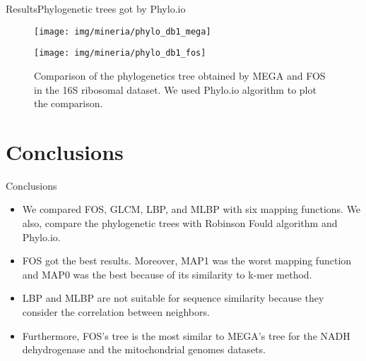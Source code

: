 \documentclass[10pt]{beamer}
\newcommand{\1}{
	\setbeamertemplate{background}{
		\texttt{[image: img/1\_dna]}
		\tikz[overlay] \fill[fill opacity=0.75,fill=white] (0,0) rectangle (-\paperwidth,\paperheight);
	}
}
\begin{document}
\begin{frame}{Results}{Phylogenetic trees got by Phylo.io}
	\begin{figure}[hbt!]
		\centering
		\begin{multicols}{2}
			\texttt{[image: img/mineria/phylo\_db1\_mega]}\par 
			\texttt{[image: img/mineria/phylo\_db1\_fos]}\par 
		\end{multicols}
		\caption{Comparison of the phylogenetics tree obtained by MEGA and FOS in the 16S ribosomal dataset. We used Phylo.io algorithm to plot the comparison.}
		\label{img:mouse}
	\end{figure}
\end{frame}

\section{Conclusions}
\begin{frame}{Conclusions}{}
	\begin{itemize}
		\item We compared FOS, GLCM, LBP, and MLBP with six mapping functions. We also, compare the phylogenetic trees with Robinson Fould algorithm and Phylo.io. \pause
		\item FOS got the best results. Moreover, MAP1 was the worst mapping function and MAP0 was the best because of its similarity to k-mer method. \pause
		\item LBP and MLBP are not suitable for sequence similarity because they consider the correlation between neighbors. \pause
		\item Furthermore, FOS's tree is the most similar to MEGA's tree for the NADH dehydrogenase and the mitochondrial genomes datasets.
	\end{itemize}
\end{frame}
\end{document}
